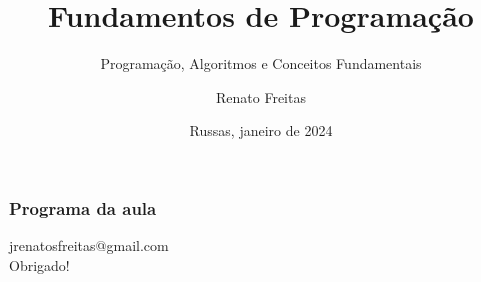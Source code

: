 \documentclass[11pt]{beamer}
\begin{document}
	\title{Fundamentos de Programação}
	\subtitle{Programação, Algoritmos e Conceitos Fundamentais}
	\author{Renato Freitas}
	\date{Russas, janeiro de 2024}
	\begin{frame}[plain]
		\maketitle
	\end{frame}
	
	
	\begin{frame}
		\frametitle{Programa da aula}
		\tableofcontents
	\end{frame}





\begin{frame}[plain]
	\maketitle
	\centering
	jrenatosfreitas@gmail.com \\ 
	
	Obrigado!
\end{frame}
\end{document}
